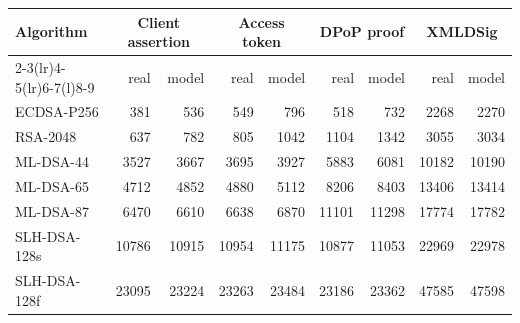 \begin{tabular}{@{}lrrrrrrrr@{}}
\toprule
Algorithm & \multicolumn{2}{c}{Client assertion} & \multicolumn{2}{c}{Access token} & \multicolumn{2}{c}{DPoP proof} & \multicolumn{2}{c}{XMLDSig} \\
\cmidrule(lr){2-3}\cmidrule(lr){4-5}\cmidrule(lr){6-7}\cmidrule(l){8-9}
 & real & model & real & model & real & model & real & model \\
\midrule
ECDSA-P256 & 381 & 536 & 549 & 796 & 518 & 732 & 2268 & 2270 \\
RSA-2048 & 637 & 782 & 805 & 1042 & 1104 & 1342 & 3055 & 3034 \\
ML-DSA-44 & 3527 & 3667 & 3695 & 3927 & 5883 & 6081 & 10182 & 10190 \\
ML-DSA-65 & 4712 & 4852 & 4880 & 5112 & 8206 & 8403 & 13406 & 13414 \\
ML-DSA-87 & 6470 & 6610 & 6638 & 6870 & 11101 & 11298 & 17774 & 17782 \\
SLH-DSA-128s & 10786 & 10915 & 10954 & 11175 & 10877 & 11053 & 22969 & 22978 \\
SLH-DSA-128f & 23095 & 23224 & 23263 & 23484 & 23186 & 23362 & 47585 & 47598 \\
\bottomrule
\end{tabular}
